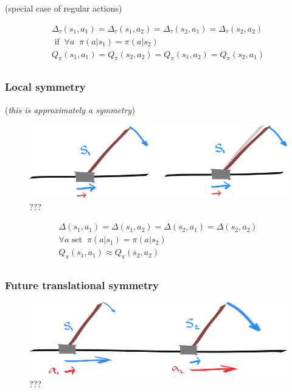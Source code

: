 (special case of regular actions)


\begin{align}
\Delta_{\tau}(s_1, a_1) = \Delta_{\tau}(s_1, a_2) = \Delta_{\tau}(s_2, a_1) = \Delta_{\tau}(s_2, a_2) \\
 \text{ if} \;\;\forall a\;\;\pi(a | s_1) = \pi(a| s_2) \\
Q_\pi(s_1, a_1) = Q_\pi(s_2, a_2)= Q_\pi(s_1, a_2) = Q_\pi(s_2, a_1) \\
\end{align}


\hypertarget{local-symmetry}{%
\subsubsection{Local symmetry}\label{local-symmetry}}

(\emph{this is approximately a symmetry})

\begin{figure}
\centering
\includegraphics[width=1\textwidth,height=0.25\textheight]{../../pictures/drawings/cart-pole-approx.png}
\caption{???}
\end{figure}

\begin{align}
\Delta(s_1, a_1) = \Delta(s_1, a_2) = \Delta(s_2, a_1) = \Delta(s_2, a_2) \\
\forall a \text{ set}\;\;\pi(a | s_1) = \pi(a| s_2) \\
Q_\pi(s_1, a_1) \approx Q_\pi(s_2, a_2)  \\
\end{align}

\hypertarget{future-translational-symmetry}{%
\subsubsection{Future translational
symmetry}\label{future-translational-symmetry}}

\begin{figure}
\centering
\includegraphics[width=1\textwidth,height=0.25\textheight]{../../pictures/drawings/cart-pole-state.png}
\caption{???}
\end{figure}

